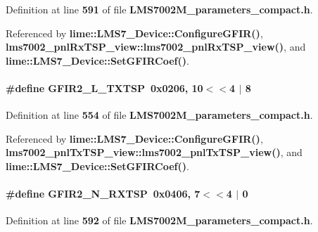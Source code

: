 Definition at line {\bf 591} of file {\bf L\+M\+S7002\+M\+\_\+parameters\+\_\+compact.\+h}.



Referenced by {\bf lime\+::\+L\+M\+S7\+\_\+\+Device\+::\+Configure\+G\+F\+I\+R()}, {\bf lms7002\+\_\+pnl\+Rx\+T\+S\+P\+\_\+view\+::lms7002\+\_\+pnl\+Rx\+T\+S\+P\+\_\+view()}, and {\bf lime\+::\+L\+M\+S7\+\_\+\+Device\+::\+Set\+G\+F\+I\+R\+Coef()}.

\paragraph[{G\+F\+I\+R2\+\_\+\+L\+\_\+\+T\+X\+T\+SP}]{\setlength{\rightskip}{0pt plus 5cm}\#define G\+F\+I\+R2\+\_\+\+L\+\_\+\+T\+X\+T\+SP~0x0206, 10$<$$<$4 $\vert$  8}\label{LMS7002M__parameters__compact_8h_a7f6f7bb2f52441514fe41525ee7d9626}


Definition at line {\bf 554} of file {\bf L\+M\+S7002\+M\+\_\+parameters\+\_\+compact.\+h}.



Referenced by {\bf lime\+::\+L\+M\+S7\+\_\+\+Device\+::\+Configure\+G\+F\+I\+R()}, {\bf lms7002\+\_\+pnl\+Tx\+T\+S\+P\+\_\+view\+::lms7002\+\_\+pnl\+Tx\+T\+S\+P\+\_\+view()}, and {\bf lime\+::\+L\+M\+S7\+\_\+\+Device\+::\+Set\+G\+F\+I\+R\+Coef()}.

\paragraph[{G\+F\+I\+R2\+\_\+\+N\+\_\+\+R\+X\+T\+SP}]{\setlength{\rightskip}{0pt plus 5cm}\#define G\+F\+I\+R2\+\_\+\+N\+\_\+\+R\+X\+T\+SP~0x0406, 7$<$$<$4 $\vert$  0}\label{LMS7002M__parameters__compact_8h_a98d6b6887b696565dc4b647cc91b3972}


Definition at line {\bf 592} of file {\bf L\+M\+S7002\+M\+\_\+parameters\+\_\+compact.\+h}.



